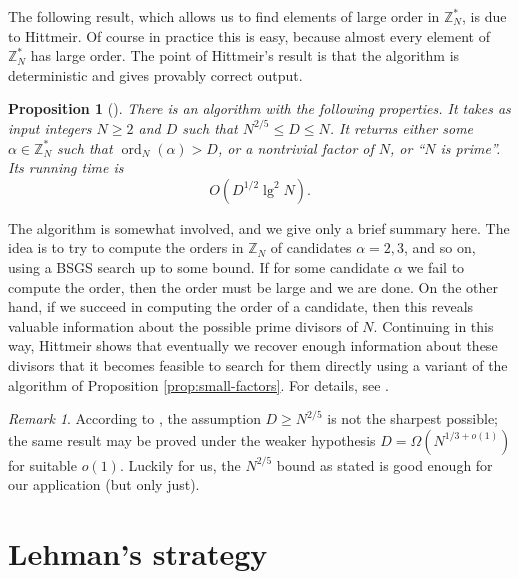 \documentclass[reqno]{amsart}
\newtheorem{prop}[thm]{Proposition}
\theoremstyle{remark}
\newtheorem{rem}[thm]{Remark}
\numberwithin{equation}{section}
\numberwithin{thm}{section}
\newcommand{\ZZ}{\mathbb{Z}}
\renewcommand{\leq}{\leqslant}
\renewcommand{\geq}{\geqslant}
\DeclareMathOperator{\ord}{ord}
\begin{document}
The following result,
which allows us to find elements of large order in $\ZZ_N^*$,
is due to Hittmeir.
Of course in practice this is easy, because almost every element of $\ZZ_N^*$
has large order.
The point of Hittmeir's result is that the algorithm is deterministic
and gives provably correct output.
\begin{prop}[]
\label{prop:find-alpha}
  There is an algorithm with the following properties.
  It takes as input integers $N \geq 2$ and $D$ such that
  $N^{2/5} \leq D \leq N$.
  It returns either some $\alpha \in \ZZ_N^*$
  such that $\ord_N(\alpha) > D$,
  or a nontrivial factor of $N$, or ``$N$ is prime''.
  Its running time is
    \[ O(D^{1/2} \lg^2 N). \]
\end{prop}
The algorithm is somewhat involved, and we give only a brief summary here.
The idea is to try to compute the orders in $\ZZ_N$ of candidates
$\alpha = 2, 3$, and so on, using a BSGS search up to some bound.
If for some candidate $\alpha$ we fail to compute the order,
then the order must be large and we are done.
On the other hand, if we succeed in computing the order of a candidate,
then this reveals valuable information about the possible prime divisors of $N$.
Continuing in this way, Hittmeir shows that eventually we recover enough
information about these divisors that it becomes feasible
to search for them directly using a variant of the algorithm of
Proposition \ref{prop:small-factors}.
For details, see \cite{Hit-BSGS}.

\begin{rem}
  According to \cite[Remark~6.4]{Hit-BSGS},
  the assumption ${D \geq N^{2/5}}$ is not the sharpest possible;
  the same result may be proved under the weaker hypothesis
  $D = \Omega(N^{1/3+o(1)})$ for suitable $o(1)$.
  Luckily for us,
  the $N^{2/5}$ bound as stated is good enough for our application
  (but only just).
\end{rem}


\section{Lehman's strategy}
\end{document}
